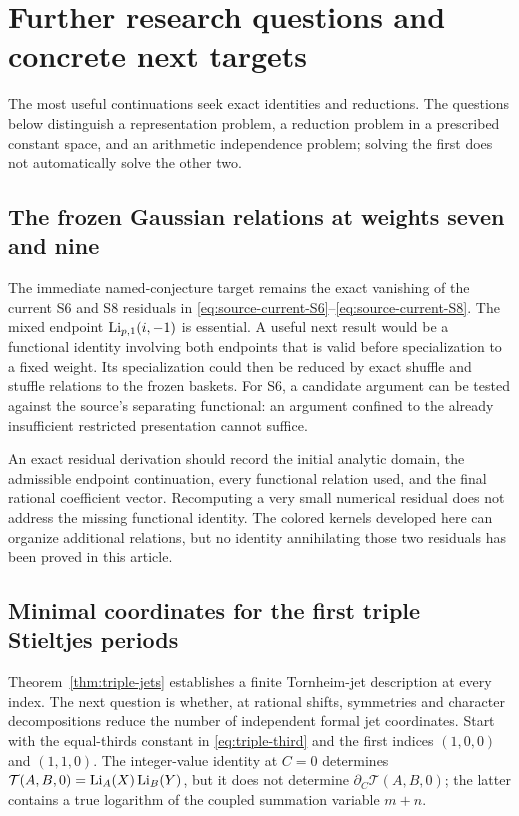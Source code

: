 \section{Further research questions and concrete next targets}
\label{sec:further}

The most useful continuations seek exact identities and reductions.
The questions below distinguish a representation problem, a reduction
problem in a prescribed constant space, and an arithmetic independence
problem; solving the first does not automatically solve the other two.

\subsection{The frozen Gaussian relations at weights seven and nine}

The immediate named-conjecture target remains the exact vanishing of
the current S6 and S8 residuals in
\eqref{eq:source-current-S6}--\eqref{eq:source-current-S8}.
The mixed endpoint $\operatorname{Li}_{p,1}(i,-1)$ is essential.  A useful next result
would be a functional identity involving both endpoints that is valid
before specialization to a fixed weight.  Its specialization could
then be reduced by exact shuffle and stuffle relations to the frozen
baskets.  For S6, a candidate argument can be tested against the
source's separating functional: an argument confined to the already
insufficient restricted presentation cannot suffice.

An exact residual derivation should record the initial analytic domain,
the admissible endpoint continuation, every functional relation used,
and the final rational coefficient vector.  Recomputing a very small
numerical residual does not address the missing functional identity.
The colored kernels developed here can organize additional relations,
but no identity annihilating those two residuals has been proved in
this article.

\subsection{Minimal coordinates for the first triple Stieltjes periods}

Theorem~\ref{thm:triple-jets} establishes a finite Tornheim-jet description
at every index.  The next question is whether, at rational shifts,
symmetries and character decompositions reduce the number of independent
formal jet coordinates.  Start with the equal-thirds constant in
\eqref{eq:triple-third} and the first indices $(1,0,0)$ and $(1,1,0)$.
The integer-value identity at $C=0$ determines
$\mathcal T(A,B,0)=\operatorname{Li}_A(X)\operatorname{Li}_B(Y)$, but it does not determine
$\partial_C\mathcal T(A,B,0)$; the latter contains a true logarithm of
the coupled summation variable $m+n$.


